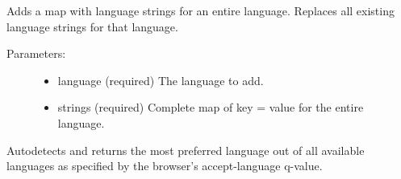 \documentclass[letterpaper,10pt,english]{sphinxmanual}
\begin{document}
\begin{fulllineitems}

\begin{fulllineitems}
Adds a map with language strings for an entire language. Replaces all existing language strings for that language.
\begin{description}
\item[{Parameters:}] \leavevmode\begin{itemize}
\item {} 
language (required)
The language to add.

\item {} 
strings (required)
Complete map of key = value for the entire language.

\end{itemize}

\end{description}

\end{fulllineitems}


\begin{fulllineitems}
\label{knop_lang:knop_lang.browserlanguage}
Autodetects and returns the most preferred language out of all available languages as specified by the browser's accept-language q-value.

\end{fulllineitems}


\begin{fulllineitems}
\label{knop_lang:knop_lang.currentlanguage}
\end{fulllineitems}



\begin{fulllineitems}
\end{fulllineitems}


\begin{fulllineitems}
\label{knop_lang:knop_lang.defaultlanguage}
\end{fulllineitems}




\end{fulllineitems}
\end{document}
